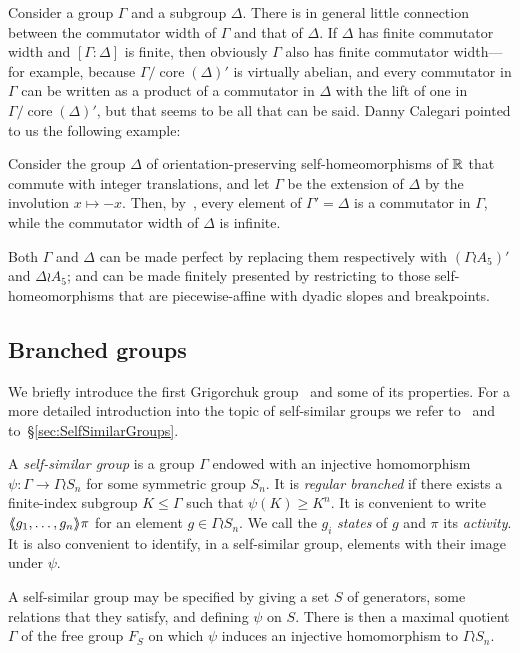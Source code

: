 \documentclass[a4paper,11pt]{amsart}
\begin{document}
Consider a group $\Gamma$ and a subgroup $\Delta$. There is in general
little connection between the commutator width of $\Gamma$ and that of
$\Delta$. If $\Delta$ has finite commutator width and
$[\Gamma:\Delta]$ is finite, then obviously $\Gamma$ also has finite
commutator width---for example, because
$\Gamma/\operatorname{core}(\Delta)'$ is virtually abelian, and every
commutator in $\Gamma$ can be written as a product of a commutator in
$\Delta$ with the lift of one in
$\Gamma/\operatorname{core}(\Delta)'$, but that seems to be all that
can be said. Danny Calegari pointed to us the following example:
\begin{ex}\label{ex:commwidthsubgroup}
  Consider the group $\Delta$ of orientation-preserving
  self-homeomorphisms of $\mathbb{R}$ that commute with integer translations,
  and let $\Gamma$ be the extension of $\Delta$ by the involution
  $x\mapsto-x$. Then, by~\cite[Theorems~2.3
  and~2.4]{Eisenbud-Hirsch-Neumann:SeifertBundles}, every element of
  $\Gamma'=\Delta$ is a commutator in $\Gamma$, while the commutator
  width of $\Delta$ is infinite.

  Both $\Gamma$ and $\Delta$ can be made perfect by replacing them
  respectively with $(\Gamma\wr A_5)'$ and $\Delta\wr A_5$; and can be
  made finitely presented by restricting to those self-homeo\-mor\-phisms
  that are piecewise-affine with dyadic slopes and breakpoints.
\end{ex}

\subsection{Branched groups}\label{ss:bg}
We briefly introduce the first Grigorchuk
group~\cite{Grigorchuk:Burnside} and some of its properties. For a more
detailed introduction into the topic of self-similar groups we refer
to~\cite{Nekrashevych:SelfSimilarGroups} and
to~\S\ref{sec:SelfSimilarGroups}.

A \emph{self-similar group} is a group $\Gamma$ endowed with an
injective homomorphism $\psi\colon\Gamma\to\Gamma\wr S_n$ for some
symmetric group $S_n$. It is \emph{regular branched} if there exists a
finite-index subgroup $K\le\Gamma$ such that $\psi(K)\ge K^n$. It is
convenient to write $\langle\negthickspace\langle g_1,\dots,g_n\rangle\negthickspace\rangle\pi$ for an element
$g\in\Gamma\wr S_n$. We call the $g_i$ \emph{states} of $g$ and $\pi$
its \emph{activity}. It is also convenient to identify, in a
self-similar group, elements with their image under $\psi$.

A self-similar group may be specified by giving a set $S$ of
generators, some relations that they satisfy, and defining $\psi$ on
$S$. There is then a maximal quotient $\Gamma$ of the free group $F_S$
on which $\psi$ induces an injective homomorphism to $\Gamma\wr S_n$.
\end{document}
